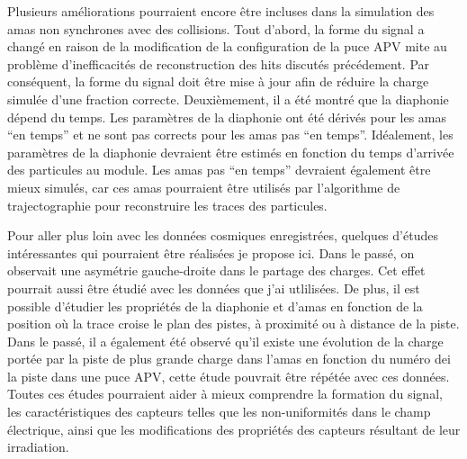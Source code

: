 Plusieurs améliorations pourraient encore être incluses dans la simulation des amas non synchrones avec des collisions. Tout d'abord, la forme du signal a changé en raison de la modification de la configuration de la puce APV mite au problème d'inefficacités de reconstruction des hits discutés précédement. Par conséquent, la forme du signal doit être mise à jour afin de réduire la charge simulée d'une fraction correcte. Deuxièmement, il a été montré que la diaphonie dépend du temps. Les paramètres de la diaphonie ont été dérivés pour les amas ``en temps'' et ne sont pas corrects pour les amas pas ``en temps''. Idéalement, les paramètres de la diaphonie devraient être estimés en fonction du temps d'arrivée des particules au module. Les amas pas ``en temps'' devraient également être mieux simulés, car ces amas pourraient être utilisés par l’algorithme de trajectographie pour reconstruire les traces des particules.



Pour aller plus loin avec les données cosmiques enregistrées, quelques d’études intéressantes qui pourraient être réalisées je propose ici. Dans le passé, on observait une asymétrie gauche-droite dans le partage des charges. Cet effet pourrait aussi être étudié avec les données que j'ai utlilisées. De plus, il est possible d'étudier les propriétés de la diaphonie et d'amas en fonction de la position où la trace croise le plan des pistes, à proximité ou à distance de la piste. Dans le passé, il a également été observé qu’il existe une évolution de la charge portée par la piste de plus grande charge dans l'amas en fonction du numéro dei la piste dans une puce APV, cette étude pouvrait être répétée avec ces données. Toutes ces études pourraient aider à mieux comprendre la formation du signal, les caractéristiques des capteurs telles que les non-uniformités dans le champ électrique, ainsi que les modifications des propriétés des capteurs résultant de leur irradiation.

